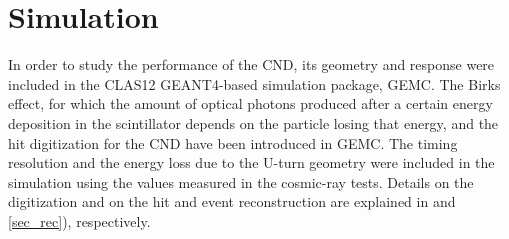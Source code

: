 \section{Simulation}
In order to study the performance of the CND, its geometry and response were included in the CLAS12 GEANT4-based simulation package, GEMC. The Birks effect, for which the amount of optical photons produced after a certain energy deposition in the scintillator depends on the particle losing that energy, and the hit digitization for the CND have been introduced in GEMC.
The timing resolution and the energy loss due to the U-turn geometry were included in the simulation using the values measured in the cosmic-ray tests.
Details on the digitization and on the hit and event reconstruction are explained in \cite{sec_gemc_cnd} and \ref{sec_rec}), respectively.

